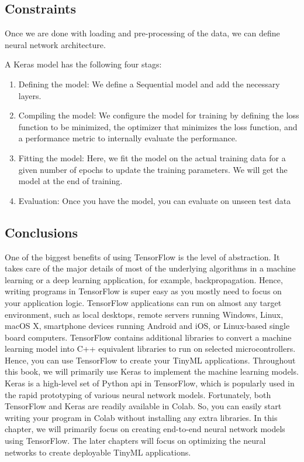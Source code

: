 \subsection{Constraints}

Once we are done with loading and pre-processing of the data, we can define neural network architecture.

A Keras model has the following four stags:

\begin{enumerate}
	
	\item Defining the model: We define a Sequential model and add the necessary layers.
	
	\item Compiling the model: We configure the model for training by defining the loss function to be minimized, the optimizer that minimizes the loss function, and a performance metric to internally evaluate the performance. 
	
	\item Fitting the model: Here, we fit the model on the actual training data for a given number of epochs to update the training parameters. We will get the model at the end of training.
	
	\item Evaluation: Once you have the model, you can evaluate on unseen test data
	
\end{enumerate}


\subsection{Conclusions}

One of the biggest benefits of using TensorFlow is the level of abstraction. It takes care of the major details of most of the underlying algorithms in a machine learning or a deep learning application, for example, backpropagation. Hence, writing programs in TensorFlow is super easy as you mostly need to focus on your application logic. TensorFlow applications can run on almost any target environment, such as local desktops, remote servers running Windows, Linux, macOS X, smartphone devices running Android and iOS, or Linux-based single board computers. TensorFlow contains additional libraries to convert a machine learning model into C++ equivalent libraries to run on selected microcontrollers. Hence, you can use TensorFlow to create your TinyML applications. Throughout this book, we will primarily use Keras to implement the machine learning models. Keras is a high-level set of Python \ac{api} in TensorFlow, which is popularly used in the rapid prototyping of various neural network models. Fortunately, both TensorFlow and Keras are readily available in Colab. So, you can easily start writing your program in Colab without installing any extra libraries. In this chapter, we will primarily focus on creating end-to-end neural network models using TensorFlow. The later chapters will focus on optimizing the neural networks to create deployable TinyML applications.

